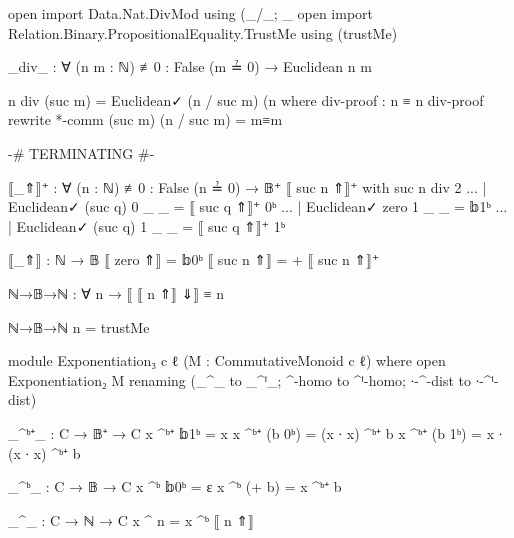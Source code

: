 \documentclass[./Thesis.tex]{subfiles}
\begin{document}
\begin{code}[hide]
  open import Data.Nat.DivMod using (_/_; _%
  open import Relation.Binary.PropositionalEquality.TrustMe using (trustMe)
\end{code}
\begin{code}
  _div_ : ∀ (n m : ℕ) {≢0 : False (m ≟ 0)} → Euclidean n m
\end{code}
\begin{code}[hide]
  n div (suc m) = Euclidean✓ (n / suc m) (n %
    where
    div-proof : n ≡ n %
    div-proof rewrite *-comm (suc m) (n / suc m) = m≡m%
\end{code}

\begin{code}[hide]
  {-# TERMINATING #-}
\end{code}
\begin{code}
  ⟦_⇑⟧⁺ : ∀ (n : ℕ) {≢0 : False (n ≟ 0)} → 𝔹⁺
  ⟦ suc n ⇑⟧⁺ with suc n div 2
  ... | Euclidean✓ (suc q) 0 _ _ = ⟦ suc q ⇑⟧⁺ 0ᵇ
  ... | Euclidean✓ zero    1 _ _ = 𝕓1ᵇ
  ... | Euclidean✓ (suc q) 1 _ _ = ⟦ suc q ⇑⟧⁺ 1ᵇ
\end{code}

\begin{code}
  ⟦_⇑⟧ : ℕ → 𝔹
  ⟦ zero ⇑⟧ = 𝕓0ᵇ
  ⟦ suc n ⇑⟧ = + ⟦ suc n ⇑⟧⁺
\end{code}

\begin{code}
  ℕ→𝔹→ℕ : ∀ n → ⟦ ⟦ n ⇑⟧ ⇓⟧ ≡ n
\end{code}
\begin{code}[hide]
  ℕ→𝔹→ℕ n = trustMe
\end{code}


\begin{code}
  module Exponentiation₃ {c ℓ} (M : CommutativeMonoid c ℓ) where
    open Exponentiation₂ M
      renaming (_^_ to _^ⁱ_; ^-homo to ^ⁱ-homo; ∙-^-dist to ∙-^ⁱ-dist)
\end{code}

\begin{code}
    _^ᵇ⁺_ : C → 𝔹⁺ → C
    x ^ᵇ⁺ 𝕓1ᵇ = x
    x ^ᵇ⁺ (b 0ᵇ) = (x ∙ x) ^ᵇ⁺ b
    x ^ᵇ⁺ (b 1ᵇ) = x ∙ (x ∙ x) ^ᵇ⁺ b

    _^ᵇ_ : C → 𝔹 → C
    x ^ᵇ 𝕓0ᵇ = ε
    x ^ᵇ (+ b) = x ^ᵇ⁺ b

    _^_ : C → ℕ → C
    x ^ n = x ^ᵇ ⟦ n ⇑⟧
\end{code}
\end{document}
